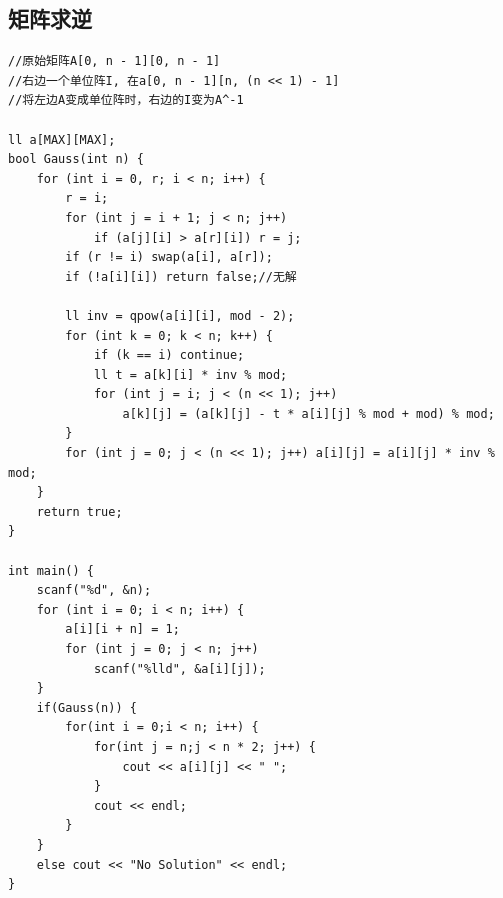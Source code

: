 \documentclass[twoside]{article}
\begin{document}
\subsection{矩阵求逆}
\begin{lstlisting}
//原始矩阵A[0, n - 1][0, n - 1]
//右边一个单位阵I, 在a[0, n - 1][n, (n << 1) - 1]
//将左边A变成单位阵时，右边的I变为A^-1

ll a[MAX][MAX];
bool Gauss(int n) {
    for (int i = 0, r; i < n; i++) {
        r = i;
        for (int j = i + 1; j < n; j++)
            if (a[j][i] > a[r][i]) r = j;
        if (r != i) swap(a[i], a[r]);
        if (!a[i][i]) return false;//无解

        ll inv = qpow(a[i][i], mod - 2);
        for (int k = 0; k < n; k++) {
            if (k == i) continue;
            ll t = a[k][i] * inv % mod;
            for (int j = i; j < (n << 1); j++)
                a[k][j] = (a[k][j] - t * a[i][j] % mod + mod) % mod;
        }
        for (int j = 0; j < (n << 1); j++) a[i][j] = a[i][j] * inv % mod;
    }
    return true;
}

int main() {
    scanf("%d", &n);
    for (int i = 0; i < n; i++) {
        a[i][i + n] = 1;
        for (int j = 0; j < n; j++)
            scanf("%lld", &a[i][j]);
    }
    if(Gauss(n)) {
        for(int i = 0;i < n; i++) {
            for(int j = n;j < n * 2; j++) {
                cout << a[i][j] << " ";
            }
            cout << endl;
        }
    }
    else cout << "No Solution" << endl;
}
\end{lstlisting}
\end{document}
